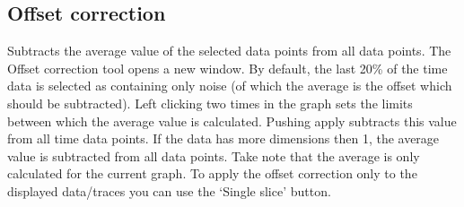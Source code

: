 \documentclass[11pt,a4paper]{article}
\begin{document}
\subsection{Offset correction}
Subtracts the average value of the selected data points from all data points.
The Offset correction tool opens a new window. By default, the last 20\% of
the time data is selected as containing only noise (of which the average is the
offset which should be subtracted). Left clicking two times in the graph sets
the limits between which the average value is calculated. Pushing apply
subtracts this value from all time data points. If the data has more
dimensions then 1, the average value is subtracted from all data points. Take
note that the average is only calculated for the current graph. To apply the
offset correction only to the displayed data/traces you can use the `Single
slice' button.


\end{document}
